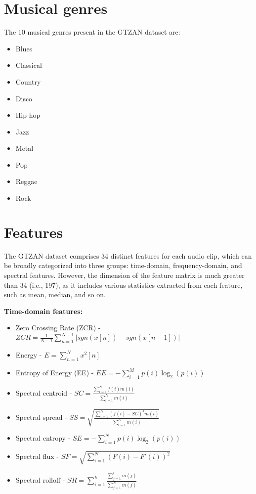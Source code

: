 \documentclass[12pt, a4paper]{article}
\begin{document}
\section*{Musical genres}

The 10 musical genres present in the GTZAN dataset are:

\begin{itemize}
\item Blues
\item Classical
\item Country
\item Disco
\item Hip-hop
\item Jazz
\item Metal
\item Pop
\item Reggae
\item Rock
\end{itemize}

\section*{Features}

The GTZAN dataset comprises 34 distinct features for each audio clip, which can be broadly categorized into three groups: time-domain, frequency-domain, and spectral features. However, the dimension of the feature matrix is much greater than 34 (i.e., 197), as it includes various statistics extracted from each feature, such as mean, median, and so on.

\textbf{Time-domain features:}

\begin{itemize}
\item Zero Crossing Rate (ZCR) - $ZCR = \frac{1}{N-1}\sum_{n=1}^{N-1}|sgn(x[n])-sgn(x[n-1])|$
\item Energy - $E = \sum_{n=1}^{N}x^2[n]$
\item Entropy of Energy (EE) - $EE = -\sum_{i=1}^{M}p(i)\log_2(p(i))$
\item Spectral centroid - $SC = \frac{\sum_{i=1}^{N}f(i)m(i)}{\sum_{i=1}^{N}m(i)}$
\item Spectral spread - $SS = \sqrt{\frac{\sum_{i=1}^{N}(f(i)-SC)^2m(i)}{\sum_{i=1}^{N}m(i)}}$
\item Spectral entropy - $SE = -\sum_{i=1}^{N}p(i)\log_2(p(i))$
\item Spectral flux - $SF = \sqrt{\sum_{i=1}^{N}(F(i)-F'(i))^2}$
\item Spectral rolloff - $SR = \sum_{i=1}^{k}\frac{\sum_{j=1}^{i}m(j)}{\sum_{j=1}^{N}m(j)}$
\end{itemize}
\end{document}
